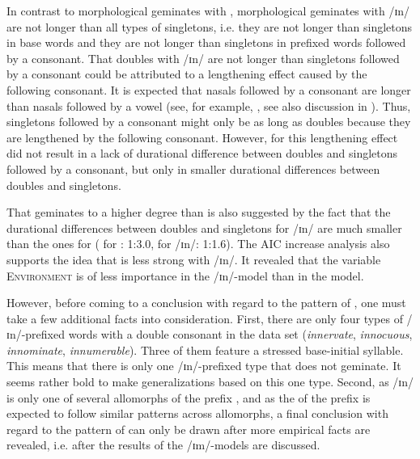 In contrast to morphological geminates with , 
morphological geminates with /ɪn/ are not longer than all types of singletons, i.e. they are not longer than singletons in base words and they are not longer than singletons in prefixed words followed by a consonant. 
That doubles with /ɪn/ are not longer than singletons followed by a consonant could be attributed to a lengthening effect caused by the following consonant.
It is expected that nasals followed by a consonant are longer than nasals followed by a vowel (see, for example, \citealt{Umeda.1977}, see also discussion in ).  Thus, singletons followed by a consonant might only be as long as doubles because they are lengthened by the following consonant. However, for  this lengthening effect did not result in a lack of durational difference between doubles and singletons followed by a consonant, but only in smaller durational differences between doubles and singletons.  

That  geminates to a higher degree than  is also suggested by the fact that the durational differences between doubles and singletons for /ɪn/ are much smaller than the ones for  ( for : 1:3.0,  for /ɪn/: 1:1.6). 
The AIC increase analysis also supports the idea that  is less strong with /ɪn/. It revealed that the variable \textsc{Environment} is of less importance in the /ɪn/-model than in the model.




However, before coming to a conclusion with regard to the  pattern of , one must take a few additional facts into consideration. 
First, there are only four types of /ɪn/-prefixed words with a double consonant in the data set (\textit{innervate}, \textit{innocuous}, \textit{innominate}, \textit{innumerable}). Three of them feature a stressed base-initial syllable. This means that there is only one /ɪn/-prefixed type that does not geminate. It seems rather bold to make generalizations based on this one type. 
Second, as /ɪn/ is only one of several allomorphs of the prefix , and as the  of the prefix  is expected to follow similar patterns across allomorphs, 
a final conclusion with regard to the  pattern of  can only be drawn after more empirical facts are revealed, i.e. after the results of the /ɪm/-models are discussed.


